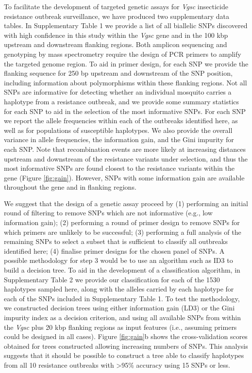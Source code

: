 \documentclass[a4paper,11pt,abstracton]{scrartcl}
\begin{document}
%
To facilitate the development of targeted genetic assays for \textit{Vgsc} insecticide resistance outbreak surveillance, we have produced two supplementary data tables.
%
In Supplementary Table 1 we provide a list of all biallelic SNPs discovered with high confidence in this study within the \textit{Vgsc} gene and in the 100 kbp upstream and downstream flanking regions.
%
Both amplicon sequencing and genotyping by mass spectrometry require the design of PCR primers to amplify the targeted genome region.
%
To aid in primer design, for each SNP we provide the flanking sequence for 250 bp upstream and downstream of the SNP position, including information about polymorphisms within these flanking regions.
%
Not all SNPs are informative for detecting whether an individual mosquito carries a haplotype from a resistance outbreak, and we provide some summary statistics for each SNP to aid in the selection of the most informative SNPs.
%
For each SNP we report the allele frequencies within each of the outbreaks identified here, as well as for populations of susceptible haplotypes.
%
We also provide the overall variance in allele frequencies, the information gain, and the Gini impurity for each SNP.
%
Note that recombination events are more likely at increasing distances upstream and downstream of the resistance variants under selection, and thus the most informative SNPs are found closest to the resistance variants within the gene (Figure \ref{fig:gain}).
%
However, SNPs with some information gain are available throughout the gene and in flanking regions.
%


%
We suggest that the design of a genetic assay proceed by (1) performing an initial round of filtering to remove SNPs which are not informative (e.g., low information gain); (2) performing a round of primer design to remove SNPs for which primers are unlikely to be successful; (3) performing a full analysis of the remaining SNPs to select a subset that is sufficient to classify all outbreaks identified here; (4) finalise primer designs for the chosen panel of SNPs.
%
A possible methodology for step 3 would be to use an algorithm such as ID3 to build a decision tree.
%
To aid in the development of a classification algorithm, in Supplementary Table 2 we provide our classification for each of the 1530 haplotypes sampled here, along with the alleles carried by each haplotype for each of the SNPs included in Supplementary Table 1.
%
To test the methodology, we constructed decision trees using either information gain (LD3) or the Gini impurity index as a decision criterion, and using all available SNPs from within the \textit{Vgsc} plus 20 kbp flanking regions as input features (i.e., assuming primers could be designed in all cases).
%
Figure \ref{fig:gain}b shows the cross-validation scores obtained for trees constructed allowing increasing numbers of SNPs.
%
This analysis suggests that it should be possible to construct a tree able to classify haplotypes from all 10 resistance outbreaks with >95\% accuracy using 15 SNPs or less.
\end{document}
